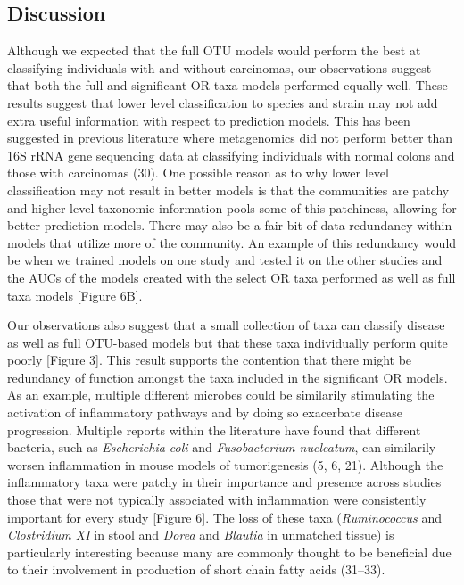 \documentclass[12pt,]{article}
\begin{document}
\newpage

\subsection{Discussion}\label{discussion}

Although we expected that the full OTU models would perform the best at
classifying individuals with and without carcinomas, our observations
suggest that both the full and significant OR taxa models performed
equally well. These results suggest that lower level classification to
species and strain may not add extra useful information with respect to
prediction models. This has been suggested in previous literature where
metagenomics did not perform better than 16S rRNA gene sequencing data
at classifying individuals with normal colons and those with carcinomas
(30). One possible reason as to why lower level classification may not
result in better models is that the communities are patchy and higher
level taxonomic information pools some of this patchiness, allowing for
better prediction models. There may also be a fair bit of data
redundancy within models that utilize more of the community. An example
of this redundancy would be when we trained models on one study and
tested it on the other studies and the AUCs of the models created with
the select OR taxa performed as well as full taxa models {[}Figure
6B{]}.

Our observations also suggest that a small collection of taxa can
classify disease as well as full OTU-based models but that these taxa
individually perform quite poorly {[}Figure 3{]}. This result supports
the contention that there might be redundancy of function amongst the
taxa included in the significant OR models. As an example, multiple
different microbes could be similarily stimulating the activation of
inflammatory pathways and by doing so exacerbate disease progression.
Multiple reports within the literature have found that different
bacteria, such as \emph{Escherichia coli} and \emph{Fusobacterium
nucleatum}, can similarily worsen inflammation in mouse models of
tumorigenesis (5, 6, 21). Although the inflammatory taxa were patchy in
their importance and presence across studies those that were not
typically associated with inflammation were consistently important for
every study {[}Figure 6{]}. The loss of these taxa (\emph{Ruminococcus}
and \emph{Clostridium XI} in stool and \emph{Dorea} and \emph{Blautia}
in unmatched tissue) is particularly interesting because many are
commonly thought to be beneficial due to their involvement in production
of short chain fatty acids (31--33).
\end{document}
